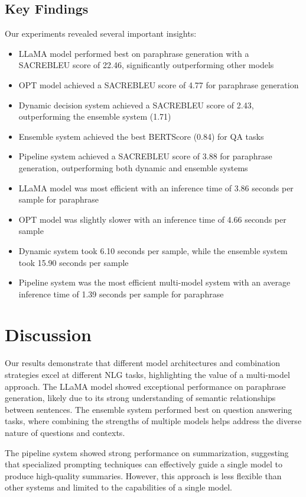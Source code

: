 \documentclass[10pt,twocolumn,letterpaper]{article}
\begin{document}
\subsection{Key Findings}

Our experiments revealed several important insights:

\begin{itemize}
    \item LLaMA model performed best on paraphrase generation with a SACREBLEU score of 22.46, significantly outperforming other models
    \item OPT model achieved a SACREBLEU score of 4.77 for paraphrase generation
    \item Dynamic decision system achieved a SACREBLEU score of 2.43, outperforming the ensemble system (1.71)
    \item Ensemble system achieved the best BERTScore (0.84) for QA tasks
    \item Pipeline system achieved a SACREBLEU score of 3.88 for paraphrase generation, outperforming both dynamic and ensemble systems
    \item LLaMA model was most efficient with an inference time of 3.86 seconds per sample for paraphrase
    \item OPT model was slightly slower with an inference time of 4.66 seconds per sample
    \item Dynamic system took 6.10 seconds per sample, while the ensemble system took 15.90 seconds per sample
    \item Pipeline system was the most efficient multi-model system with an average inference time of 1.39 seconds per sample for paraphrase
\end{itemize}

\section{Discussion}

Our results demonstrate that different model architectures and combination strategies excel at different NLG tasks, highlighting the value of a multi-model approach. The LLaMA model showed exceptional performance on paraphrase generation, likely due to its strong understanding of semantic relationships between sentences. The ensemble system performed best on question answering tasks, where combining the strengths of multiple models helps address the diverse nature of questions and contexts.

The pipeline system showed strong performance on summarization, suggesting that specialized prompting techniques can effectively guide a single model to produce high-quality summaries. However, this approach is less flexible than other systems and limited to the capabilities of a single model.
\end{document}
